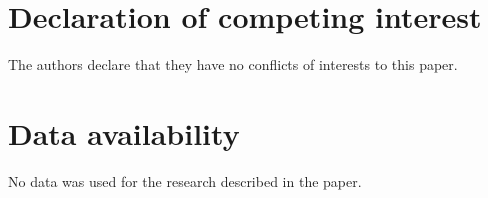 \documentclass[11pt]{article}
\numberwithin{equation}{section}
\begin{document}
\section*{Declaration of competing interest}
The authors declare that they have no conflicts of interests to this paper.

\section*{Data availability}
No data was used for the research described in the paper.

                
\end{document}
